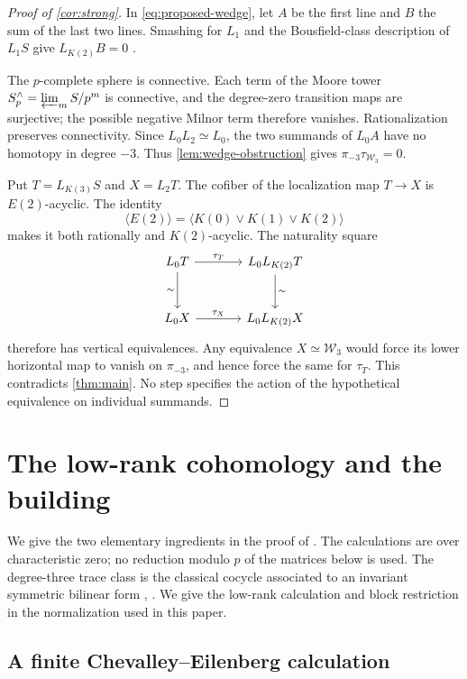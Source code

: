 \documentclass[11pt]{article}
\numberwithin{equation}{section}
\theoremstyle{definition}
\theoremstyle{remark}
\begin{document}
\begin{proof}[Proof of \cref{cor:strong}]
In \eqref{eq:proposed-wedge}, let \(A\) be the first line and \(B\)
the sum of the last two lines. Smashing for \(L_1\) and the
Bousfield-class description of \(L_1S\) give \(L_{K(2)}B=0\)
\cite[Theorem~5.1 and Proposition~5.3]{HS1999}.

The \(p\)-complete sphere is connective. Each term of the Moore tower
\(S_p^\wedge=\varprojlim_m S/p^m\) is connective, and the degree-zero
transition maps are surjective; the possible negative Milnor term
therefore vanishes. Rationalization preserves connectivity. Since
\(L_0L_2\simeq L_0\), the two summands of \(L_0A\) have no homotopy
in degree \(-3\). Thus \cref{lem:wedge-obstruction} gives
\(\pi_{-3}\tau_{\mathcal W_3}=0\).

Put \(T=L_{K(3)}S\) and \(X=L_2T\). The cofiber of the localization
map \(T\to X\) is \(E(2)\)-acyclic. The identity
\[
 \langle E(2)\rangle
       =\langle K(0)\vee K(1)\vee K(2)\rangle
\]
makes it both rationally and \(K(2)\)-acyclic. The naturality square
\[
\begin{tikzcd}[column sep=large,row sep=large]
 L_0T\arrow[r,"\tau_T"]\arrow[d,"\sim"']
      &L_0L_{K(2)}T\arrow[d,"\sim"]\\
 L_0X\arrow[r,"\tau_X"]&L_0L_{K(2)}X
\end{tikzcd}
\]
therefore has vertical equivalences. Any equivalence
\(X\simeq\mathcal W_3\) would force its lower horizontal map to vanish
on \(\pi_{-3}\), and hence force the same for \(\tau_T\).
This contradicts \cref{thm:main}. No step specifies the action of
the hypothetical equivalence on individual summands.
\end{proof}

\appendix
\section{The low-rank cohomology and the building}
\label{app:background}

We give the two elementary ingredients in the proof of
.  The calculations are over characteristic
zero; no reduction modulo $p$ of the matrices below is used.
The degree-three trace class is the classical cocycle associated to an
invariant symmetric bilinear form
\cite[\S21]{ChevalleyEilenberg1948}, \cite[\S11]{Koszul1950}.
We give the low-rank calculation and block restriction in the
normalization used in this paper.

\subsection{A finite Chevalley--Eilenberg calculation}
\label{app:ce}
\end{document}
